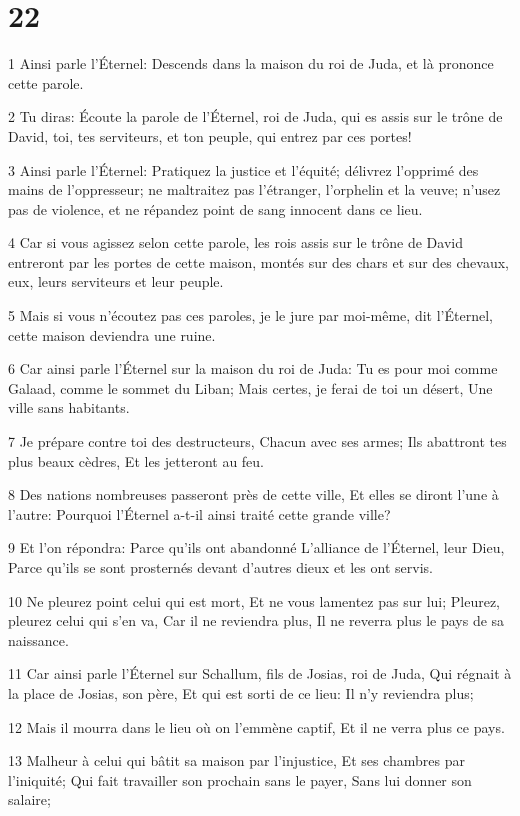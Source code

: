 \chapter{22}

\par 1 Ainsi parle l'Éternel: Descends dans la maison du roi de Juda, et là prononce cette parole.
\par 2 Tu diras: Écoute la parole de l'Éternel, roi de Juda, qui es assis sur le trône de David, toi, tes serviteurs, et ton peuple, qui entrez par ces portes!
\par 3 Ainsi parle l'Éternel: Pratiquez la justice et l'équité; délivrez l'opprimé des mains de l'oppresseur; ne maltraitez pas l'étranger, l'orphelin et la veuve; n'usez pas de violence, et ne répandez point de sang innocent dans ce lieu.
\par 4 Car si vous agissez selon cette parole, les rois assis sur le trône de David entreront par les portes de cette maison, montés sur des chars et sur des chevaux, eux, leurs serviteurs et leur peuple.
\par 5 Mais si vous n'écoutez pas ces paroles, je le jure par moi-même, dit l'Éternel, cette maison deviendra une ruine.
\par 6 Car ainsi parle l'Éternel sur la maison du roi de Juda: Tu es pour moi comme Galaad, comme le sommet du Liban; Mais certes, je ferai de toi un désert, Une ville sans habitants.
\par 7 Je prépare contre toi des destructeurs, Chacun avec ses armes; Ils abattront tes plus beaux cèdres, Et les jetteront au feu.
\par 8 Des nations nombreuses passeront près de cette ville, Et elles se diront l'une à l'autre: Pourquoi l'Éternel a-t-il ainsi traité cette grande ville?
\par 9 Et l'on répondra: Parce qu'ils ont abandonné L'alliance de l'Éternel, leur Dieu, Parce qu'ils se sont prosternés devant d'autres dieux et les ont servis.
\par 10 Ne pleurez point celui qui est mort, Et ne vous lamentez pas sur lui; Pleurez, pleurez celui qui s'en va, Car il ne reviendra plus, Il ne reverra plus le pays de sa naissance.
\par 11 Car ainsi parle l'Éternel sur Schallum, fils de Josias, roi de Juda, Qui régnait à la place de Josias, son père, Et qui est sorti de ce lieu: Il n'y reviendra plus;
\par 12 Mais il mourra dans le lieu où on l'emmène captif, Et il ne verra plus ce pays.
\par 13 Malheur à celui qui bâtit sa maison par l'injustice, Et ses chambres par l'iniquité; Qui fait travailler son prochain sans le payer, Sans lui donner son salaire;
